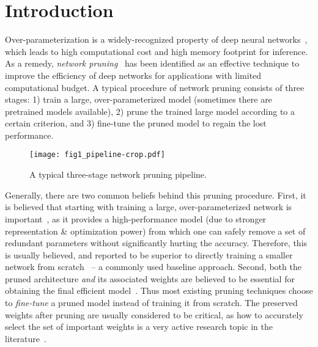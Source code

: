 \section{Introduction}

Over-parameterization is a widely-recognized property of deep neural networks~\cite{lowrank1, deep}, which leads to high computational cost and high memory footprint for inference. As a remedy, \emph{network pruning}~\cite{obd,obs,han2015learning, nvidia, li2016pruning} has been identified as an effective technique to improve the  efficiency of deep networks for applications with limited computational budget. A typical procedure of network pruning consists of three stages: 1) train a large, over-parameterized model (sometimes there are pretrained models available), 2) prune the trained large model according to a certain criterion, and 3) fine-tune the pruned model to regain the lost performance.

\begin{figure}
  \begin{center}
    \texttt{[image: fig1\_pipeline-crop.pdf]}
  \end{center}
\caption{A typical three-stage network pruning pipeline.}
    \label{fig1}
\end{figure}

Generally, there are two common beliefs behind this pruning procedure. First, it is believed that starting with training a large, over-parameterized network is important~\cite{luo2017thinet,carreira2018learning}, as it provides a high-performance model (due to stronger representation \& optimization power) from which one can safely remove a set of redundant parameters without significantly hurting the accuracy. Therefore, this is usually believed, and reported to be superior to directly training a smaller network from scratch~\cite{li2016pruning,luo2017thinet,he2017channel,nisp} -- a commonly used baseline approach.   
Second, both the pruned architecture \emph{and} its associated weights are believed to be essential for obtaining the final efficient model~\cite{han2015learning}. Thus most existing pruning techniques choose to \emph{fine-tune} a pruned model instead of training it from scratch. The preserved weights after pruning are usually considered to be critical, as how to accurately select the set of important weights is a very active research topic in the literature~\cite{nvidia,li2016pruning,luo2017thinet, he2017channel, liu2017learning,pfa}.


